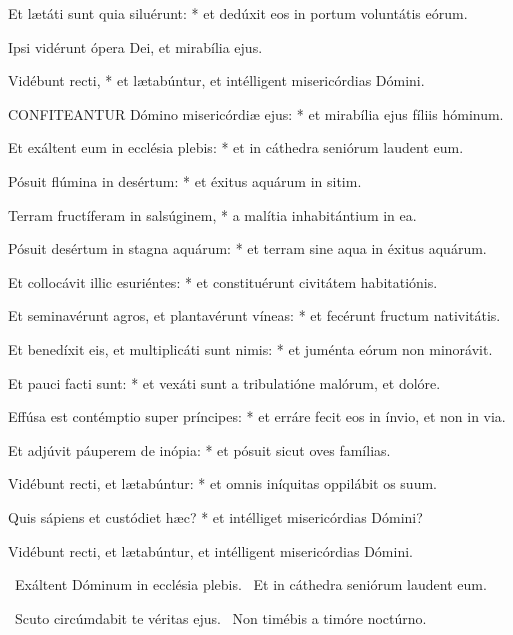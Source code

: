 Et lætáti sunt quia siluérunt: * et dedúxit eos in portum voluntátis eórum.

 Ipsi vidérunt ópera Dei, et mirabília ejus.

 Vidébunt recti, * et lætabúntur, et intélligent misericórdias Dómini.


\lettrine[lines=2]{C}{ONFITEANTUR} Dómino misericórdiæ ejus: * et mirabília ejus fíliis hóminum.

Et exáltent eum in ecclésia plebis: * et in cáthedra seniórum laudent eum.

Pósuit flúmina in desértum: * et éxitus aquárum in sitim.

Terram fructíferam in salsúginem, * a malítia inhabitántium in ea.

Pósuit desértum in stagna aquárum: * et terram sine aqua in éxitus aquárum.

Et collocávit illic esuriéntes: * et constituérunt civitátem habitatiónis.

Et seminavérunt agros, et plantavérunt víneas: * et fecérunt fructum nativitátis.

Et benedíxit eis, et multiplicáti sunt nimis: * et juménta eórum non minorávit.

Et pauci facti sunt: * et vexáti sunt a tribulatióne malórum, et dolóre.

Effúsa est contémptio super príncipes: * et erráre fecit eos in ínvio, et non in via.

Et adjúvit páuperem de inópia: * et pósuit sicut oves famílias.

Vidébunt recti, et lætabúntur: * et omnis iníquitas oppilábit os suum.

Quis sápiens et custódiet hæc? * et intélliget misericórdias Dómini?


 Vidébunt recti, et lætabúntur, et intélligent misericórdias Dómini.


\V\ Exáltent Dóminum in ecclésia plebis. \R\ Et in cáthedra seniórum laudent eum.


\V\ Scuto circúmdabit te véritas ejus. \R\ Non timébis a timóre noctúrno.


